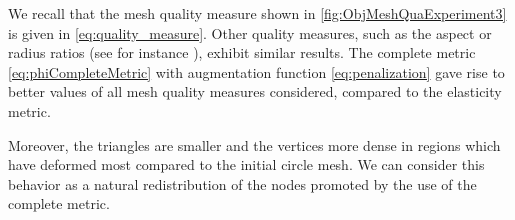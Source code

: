 \begin{remark}
	\label{remark:relationMeshQualityMeasures}
	We recall that the mesh quality measure shown in \cref{fig:ObjMeshQuaExperiment3} is given in \eqref{eq:quality_measure}.
		Other quality measures, such as the aspect or radius ratios (see for instance \cite[Table~6, Rows~7 and~9]{Shewchuk:2002:1}), exhibit similar results.
	The complete metric \eqref{eq:phiCompleteMetric} with augmentation function \eqref{eq:penalization} gave rise to better values of all mesh quality measures considered, compared to the elasticity metric.
\end{remark}

Moreover, the triangles are smaller and the vertices more dense in regions which have deformed most compared to the initial circle mesh.
We can consider this behavior as a natural redistribution of the nodes promoted by the use of the complete metric.

